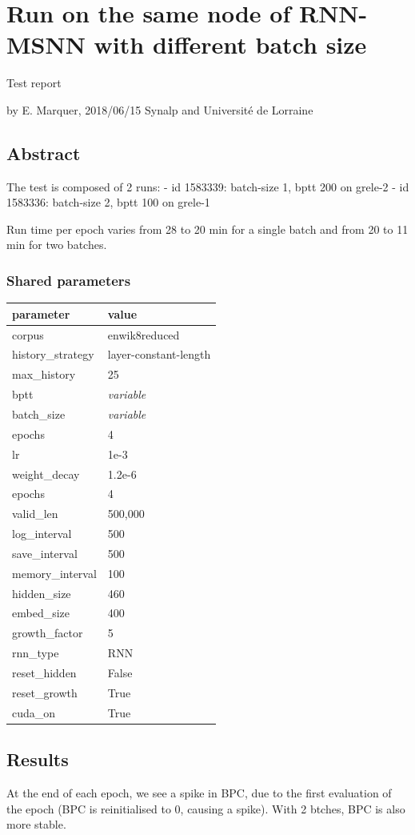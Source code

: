 \section{Run on the same node of RNN-MSNN with different batch
size}\label{run-on-the-same-node-of-rnn-msnn-with-different-batch-size}

Test report

by E. Marquer, 2018/06/15 Synalp and Université de Lorraine

\subsection{Abstract}\label{abstract}

The test is composed of 2 runs: - id 1583339: batch-size 1, bptt 200 on
grele-2 - id 1583336: batch-size 2, bptt 100 on grele-1

Run time per epoch varies from 28 to 20 min for a single batch and from
20 to 11 min for two batches.

\subsubsection{Shared parameters}\label{shared-parameters}

\begin{longtable}[]{@{}ll@{}}
\toprule
parameter & value\tabularnewline
\midrule
\endhead
corpus & enwik8reduced\tabularnewline
history\_strategy & layer-constant-length\tabularnewline
max\_history & 25\tabularnewline
bptt & \emph{variable}\tabularnewline
batch\_size & \emph{variable}\tabularnewline
epochs & 4\tabularnewline
lr & 1e-3\tabularnewline
weight\_decay & 1.2e-6\tabularnewline
epochs & 4\tabularnewline
valid\_len & 500,000\tabularnewline
log\_interval & 500\tabularnewline
save\_interval & 500\tabularnewline
memory\_interval & 100\tabularnewline
hidden\_size & 460\tabularnewline
embed\_size & 400\tabularnewline
growth\_factor & 5\tabularnewline
rnn\_type & RNN\tabularnewline
reset\_hidden & False\tabularnewline
reset\_growth & True\tabularnewline
cuda\_on & True\tabularnewline
\bottomrule
\end{longtable}

\subsection{Results}\label{results}

At the end of each epoch, we see a spike in BPC, due to the first
evaluation of the epoch (BPC is reinitialised to 0, causing a spike).
With 2 btches, BPC is also more stable.

